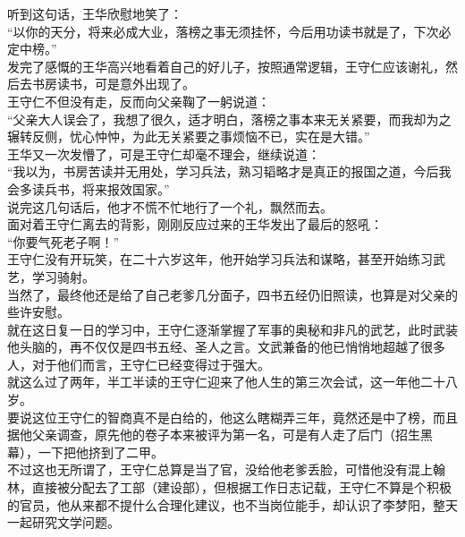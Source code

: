 \begin{multicols}{\theparacolNo}
听到这句话，王华欣慰地笑了：\\

“以你的天分，将来必成大业，落榜之事无须挂怀，今后用功读书就是了，下次必定中榜。”\\

发完了感慨的王华高兴地看着自己的好儿子，按照通常逻辑，王守仁应该谢礼，然后去书房读书，可是意外出现了。\\

王守仁不但没有走，反而向父亲鞠了一躬说道：\\

“父亲大人误会了，我想了很久，适才明白，落榜之事本来无关紧要，而我却为之辗转反侧，忧心忡忡，为此无关紧要之事烦恼不已，实在是大错。”\\

王华又一次发懵了，可是王守仁却毫不理会，继续说道：\\

“我以为，书房苦读并无用处，学习兵法，熟习韬略才是真正的报国之道，今后我会多读兵书，将来报效国家。”\\

说完这几句话后，他才不慌不忙地行了一个礼，飘然而去。\\

面对着王守仁离去的背影，刚刚反应过来的王华发出了最后的怒吼：\\

“你要气死老子啊！”\\

王守仁没有开玩笑，在二十六岁这年，他开始学习兵法和谋略，甚至开始练习武艺，学习骑射。\\

当然了，最终他还是给了自己老爹几分面子，四书五经仍旧照读，也算是对父亲的些许安慰。\\

就在这日复一日的学习中，王守仁逐渐掌握了军事的奥秘和非凡的武艺，此时武装他头脑的，再不仅仅是四书五经、圣人之言。文武兼备的他已悄悄地超越了很多人，对于他们而言，王守仁已经变得过于强大。\\

就这么过了两年，半工半读的王守仁迎来了他人生的第三次会试，这一年他二十八岁。\\

要说这位王守仁的智商真不是白给的，他这么瞎糊弄三年，竟然还是中了榜，而且据他父亲调查，原先他的卷子本来被评为第一名，可是有人走了后门（招生黑幕），一下把他挤到了二甲。\\

不过这也无所谓了，王守仁总算是当了官，没给他老爹丢脸，可惜他没有混上翰林，直接被分配去了工部（建设部），但根据工作日志记载，王守仁不算是个积极的官员，他从来都不提什么合理化建议，也不当岗位能手，却认识了李梦阳，整天一起研究文学问题。\\


\end{multicols}
